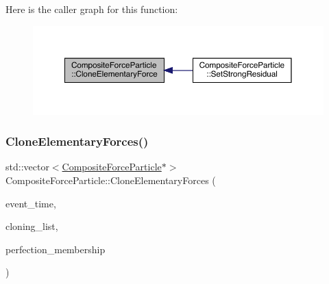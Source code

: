 Here is the caller graph for this function\+:\nopagebreak
\begin{figure}[H]
\begin{center}
\leavevmode
\includegraphics[width=350pt]{class_composite_force_particle_a8163b425c10bd9cb9097d99e5d53d0a1_icgraph}
\end{center}
\end{figure}
\mbox{\label{class_composite_force_particle_a2e620a92eaca67dbb482a7fd8e248f7b}} 
\subsubsection{\texorpdfstring{Clone\+Elementary\+Forces()}{CloneElementaryForces()}}
{\footnotesize\ttfamily std\+::vector$<$\hyperlink{class_composite_force_particle}{Composite\+Force\+Particle}$\ast$$>$ Composite\+Force\+Particle\+::\+Clone\+Elementary\+Forces (\begin{DoxyParamCaption}\item[{std\+::chrono\+::time\+\_\+point$<$ \hyperlink{universe_8h_a0ef8d951d1ca5ab3cfaf7ab4c7a6fd80}{Clock} $>$}]{event\+\_\+time,  }\item[{std\+::vector$<$ \hyperlink{class_composite_force_particle}{Composite\+Force\+Particle} $\ast$$>$}]{cloning\+\_\+list,  }\item[{double}]{perfection\+\_\+membership }\end{DoxyParamCaption})}

